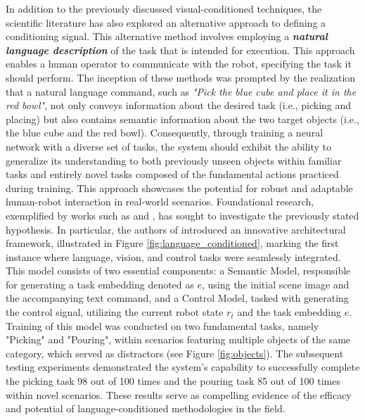 

In addition to the previously discussed visual-conditioned techniques, the scientific literature has also explored an alternative approach to defining a conditioning signal. This alternative method involves employing a \textit{\textbf{natural language description}} of the task that is intended for execution. This approach enables a human operator to communicate with the robot, specifying the task it should perform. The inception of these methods was prompted by the realization that a natural language command, such as \textit{"Pick the blue cube and place it in the red bowl"}, not only conveys information about the desired task (i.e., picking and placing) but also contains semantic information about the two target objects (i.e., the blue cube and the red bowl). Consequently, through training a neural network with a diverse set of tasks, the system should exhibit the ability to generalize its understanding to both previously unseen objects within familiar tasks and entirely novel tasks composed of the fundamental actions practiced during training. This approach showcases the potential for robust and adaptable human-robot interaction in real-world scenarios.
\newline Foundational research, exemplified by works such as \cite{stepputtis2020language} and \cite{jang2022bc_z}, has sought to investigate the previously stated hypothesis. In particular, the authors of \cite{stepputtis2020language} introduced an innovative architectural framework, illustrated in Figure \ref{fig:language_conditioned}, marking the first instance where language, vision, and control tasks were seamlessly integrated. This model consists of two essential components: a Semantic Model, responsible for generating a task embedding denoted as $e$, using the initial scene image and the accompanying text command, and a Control Model, tasked with generating the control signal, utilizing the current robot state $r_{t}$ and the task embedding $e$.
Training of this model was conducted on two fundamental tasks, namely "Picking" and "Pouring", within scenarios featuring multiple objects of the same category, which served as distractors (see Figure \ref{fig:objects}). The subsequent testing experiments demonstrated the system's capability to successfully complete the picking task 98 out of 100 times and the pouring task 85 out of 100 times within novel scenarios. These results serve as compelling evidence of the efficacy and potential of language-conditioned methodologies in the field.

